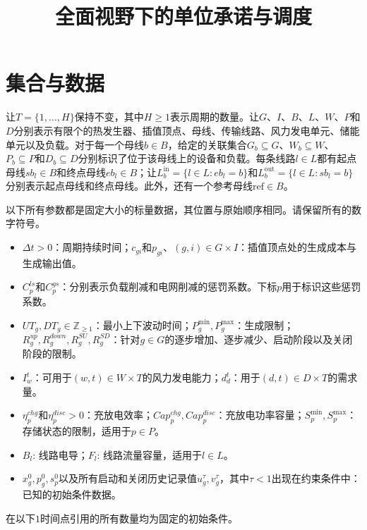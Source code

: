 \documentclass[11pt,a4paper]{article}
\title{全面视野下的单位承诺与调度}
\author{}
\date{}
\begin{document}
\maketitle

\section{集合与数据}
让$T=\{1,\ldots,H\}$保持不变，其中$H\geq1$表示周期的数量。让$G$、$I$、$B$、$L$、$W$、$P$和$D$分别表示有限个的热发生器、插值顶点、母线、传输线路、风力发电单元、储能单元以及负载。对于每一个母线$b\in B$，给定的关联集合$G_b\subseteq G$、$W_b\subseteq W$、$P_b\subseteq P$和$D_b\subseteq D$分别标识了位于该母线上的设备和负载。每条线路$l\in L$都有起点母线$sb_l\in B$和终点母线$eb_l\in B$；让$L_b^{\mathrm{in}}=\{l\in L:eb_l=b\}$和$L_b^{\mathrm{out}}=\{l\in L:sb_l=b\}$分别表示起点母线和终点母线。此外，还有一个参考母线$\mathrm{ref}\in B$。

以下所有参数都是固定大小的标量数据，其位置与原始顺序相同。请保留所有的数字符号。
\begin{itemize}
\item $\Delta t>0$：周期持续时间；$c_{gi}$和$p_{gi}$、$(g,i)\in G\times I$：插值顶点处的生成成本与生成输出值。 
\item $C_p^{ls}$和$C_p^{gs}$：分别表示负载削减和电网削减的惩罚系数。下标$p$用于标识这些惩罚系数。
\item $UT_g,DT_g\in\mathbb Z_{\geq1}$：最小上下波动时间；$P_g^{\min},P_g^{\max}$：生成限制；$R_g^{up},R_g^{down},R_g^{SU},R_g^{SD}$：针对$g\in G$的逐步增加、逐步减少、启动阶段以及关闭阶段的限制。
\item $I_w^t$：可用于$(w,t)\in W\times T$的风力发电能力；$d_d^t$：用于$(d,t)\in D\times T$的需求量。
\item $\eta_p^{chg}$和$\eta_p^{disc}>0$：充放电效率；$Cap_p^{chg},Cap_p^{disc}$：充放电功率容量；$S_p^{\min},S_p^{\max}$：存储状态的限制，适用于$p\in P$。
\item $B_l$: 线路电导；$F_l$: 线路流量容量，适用于$l\in L$。
\item $x_g^0,p_g^0,s_p^0$以及所有启动和关闭历史记录值$u_g^\tau,v_g^\tau$，其中$\tau<1$出现在约束条件中：已知的初始条件数据。
\end{itemize}
在以下$1$时间点引用的所有数量均为固定的初始条件。
\end{document}
